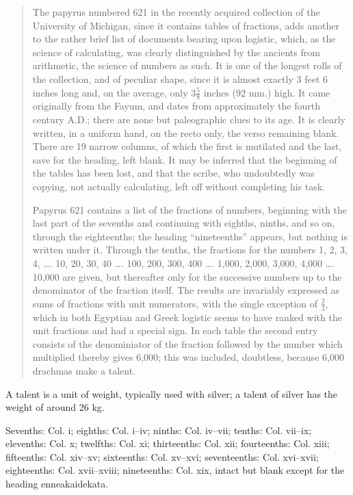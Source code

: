\documentclass{article}
\newcommand{\Gk}[1]{\selectlanguage{polutonikogreek}#1\selectlanguage{english}}
\begin{document}
\begin{quote}
The papyrus numbered 621 in the recently acquired collection of the University of Michigan, since it contains tables of fractions, adds another to the rather brief list of documents
bearing upon logistic, which, as the science of calculating, was clearly distinguished by the ancients from arithmetic, the science of numbers as such. It is one of the longest rolls of
the collection, and of peculiar shape, since it is almost exactly 3 feet 6 inches long and, on the average, only $3\frac{5}{8}$ inches (92 mm.) high. It came originally from the Fayum, and dates from approximately the fourth century A.D.; there are none but paleographic clues to its age. It is clearly written, in a uniform hand, on the recto only, the verso remaining blank.
There are 19 narrow columns, of which the first is mutilated and the last, save for the heading, left blank. It may be inferred that the beginning of the tables has been lost, and that the scribe, who undoubtedly was copying, not actually calculating, left off without completing his task.

Papyrus 621 contains a list of the fractions of numbers, beginning with the last part of the sevenths and continuing with eighths, ninths, and so on, through the eighteenths; the
heading ``nineteenths'' appears, but nothing is written under it. Through the tenths, the fractions for the numbers 1, 2, 3, 4, \dots. 10, 20, 30, 40 \dots. 100, 200, 300, 400 \dots. 1,000, 2,000, 3,000, 4,000 \dots. 10,000 are given, but thereafter only for the successive numbers up to the denominator of the fraction itself. The results are invariably expressed as sums of fractions with unit numerators, with the single exception of $\frac{2}{3}$, which in both Egyptian and Greek logistic seems to have ranked with the unit fractions and had a special sign. In
each table the second entry consists of the denominiator of the fraction followed by the number which multiplied thereby gives 6,000; this was included, doubtless, because 6,000 drachmas make a talent.
\end{quote}

A talent is a unit of weight, typically used with silver; a talent of silver has the weight of around 26 kg. 

Sevenths: Col. i;
eighths: Col. i--iv;
ninths: Col. iv--vii;
tenths: Col. vii--ix;
elevenths: Col. x;
twelfths: Col. xi;
thirteenths: Col. xii;
fourteenths: Col. xiii;
fifteenths: Col. xiv--xv;
sixteenths: Col. xv--xvi;
seventeenths: Col. xvi--xvii;
eighteenths: Col. xvii--xviii;
nineteenths: Col. xix, intact but blank except for the heading \Gk{enneakaidekata}.
\end{document}
